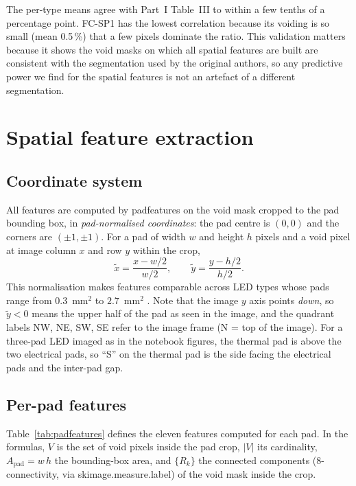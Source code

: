 \documentclass[11pt,a4paper]{article}
\newcommand{\code}[1]{{\ttfamily\def\_{\textunderscore\allowbreak}#1}}
\begin{document}
The per-type means agree with Part~I Table~III to within a few tenths of a percentage point.
FC-SP1 has the lowest correlation because its voiding is so small (mean 0.5\,\%) that a few
pixels dominate the ratio. This validation matters because it shows the void masks on which all
spatial features are built are consistent with the segmentation used by the original authors,
so any predictive power we find for the spatial features is not an artefact of a different
segmentation.

\section{Spatial feature extraction}
\label{sec:features}

\subsection{Coordinate system}

All features are computed by \code{pad\_features} on the void mask cropped to the pad bounding
box, in \emph{pad-normalised coordinates}: the pad centre is $(0,0)$ and the corners are
$(\pm1,\pm1)$. For a pad of width $w$ and height $h$ pixels and a void pixel at image column $x$
and row $y$ within the crop,
\begin{equation}
  \tilde{x} = \frac{x - w/2}{w/2}, \qquad \tilde{y} = \frac{y - h/2}{h/2}.
\end{equation}
This normalisation makes features comparable across LED types whose pads range from
$0.3$~mm$^2$ to $2.7$~mm$^2$ \cite{part2}. Note that the image $y$ axis points \emph{down}, so
$\tilde{y} < 0$ means the upper half of the pad as seen in the image, and the quadrant labels
NW, NE, SW, SE refer to the image frame (N = top of the image). For a three-pad LED imaged as
in the notebook figures, the thermal pad is above the two electrical pads, so ``S'' on the
thermal pad is the side facing the electrical pads and the inter-pad gap.

\subsection{Per-pad features}

Table~\ref{tab:padfeatures} defines the eleven features computed for each pad. In the formulas,
$V$ is the set of void pixels inside the pad crop, $|V|$ its cardinality, $A_{\mathrm{pad}} = w\,h$
the bounding-box area, and $\{R_k\}$ the connected components (8-connectivity, via
\code{skimage.measure.label}) of the void mask inside the crop.
\end{document}
